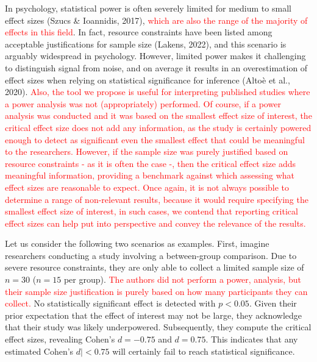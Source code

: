 \documentclass[
  man]{apa7}
\begin{document}
In psychology, statistical power is often severely limited for medium to small effect sizes (Szucs \& Ioannidis, 2017), \textcolor{red}{which are also the range of the majority of effects in this field}. In fact, resource constraints have been listed among acceptable justifications for sample size (Lakens, 2022), and this scenario is arguably widespread in psychology. However, limited power makes it challenging to distinguish signal from noise, and on average it results in an overestimation of effect sizes when relying on statistical significance for inference (Altoè et al., 2020). \textcolor{red}{Also, the tool we propose is useful for interpreting published studies where a power analysis was not (appropriately) performed. Of course, if a power analysis was conducted and it was based on the smallest effect size of interest, the critical effect size does not add any information, as the study is certainly powered enough to detect as significant even the smallest effect that could be meaningful to the researchers. However, if the sample size was purely justified based on resource constraints - as it is often the case -, then the critical effect size adds meaningful information, providing a benchmark against which assessing what effect sizes are reasonable to expect. Once again, it is not always possible to determine a range of non-relevant results, because it would require specifying the smallest effect size of interest, in such cases, we contend that reporting critical effect sizes can help put into perspective and convey the relevance of the results.}

Let us consider the following two scenarios as examples. First, imagine researchers conducting a study involving a between-group comparison. Due to severe resource constraints, they are only able to collect a limited sample size of \(n = 30\) (\(n = 15\) per group). \textcolor{red}{The authors did not perform a power, analysis, but their sample size justification is purely based on how many participants they can collect.} No statistically significant effect is detected with \(p < 0.05\). Given their prior expectation that the effect of interest may not be large, they acknowledge that their study was likely underpowered. Subsequently, they compute the critical effect sizes, revealing Cohen's \(d = -0.75\) and \(d = 0.75\). This indicates that any estimated \textbar Cohen's \(d| < 0.75\) will certainly fail to reach statistical significance.
\end{document}
